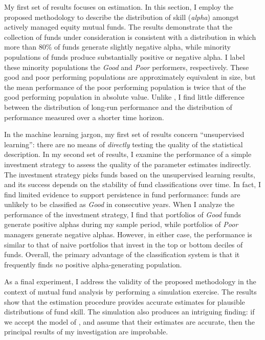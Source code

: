 	My first set of results focuses on estimation. In this section, I employ the proposed methodology to describe the distribution of skill (\textit{alpha}) amongst actively managed equity mutual funds. The results demonstrate that the collection of funds under consideration is consistent with a distribution in which more than 80\% of funds generate slightly negative alpha, while minority populations of funds produce substantially positive or negative alpha. I label these minority populations the \textit{Good} and \textit{Poor} performers, respectively. These good and poor performing populations are approximately equivalent in size, but the mean performance of the poor performing population is twice that of the good performing population in absolute value. Unlike \citet{Barras2010}, I find little difference between the distribution of long-run performance and the distribution of performance measured over a shorter time horizon.

	In the machine learning jargon, my first set of results concern ``unsupervised learning'': there are no means of \textit{directly} testing the quality of the statistical description. In my second set of results, I examine the performance of a simple investment strategy to assess the quality of the parameter estimates indirectly. The investment strategy picks funds based on the unsupervised learning results, and its success depends on the stability of fund classifications over time. In fact, I find limited evidence to support persistence in fund performance: funds are unlikely to be classified as \textit{Good} in consecutive years. When I analyze the performance of the investment strategy, I find that portfolios of \textit{Good} funds generate positive alphas during my sample period, while portfolios of \textit{Poor} managers generate negative alphas. However, in either case, the performance is similar to that of naive portfolios that invest in the top or bottom deciles of funds. Overall, the primary advantage of the classification system is that it frequently finds \textit{no} positive alpha-generating population.

	As a final experiment, I address the validity of the proposed methodology in the context of mutual fund analysis by performing a simulation exercise. The results show that the estimation procedure provides accurate estimates for plausible distributions of fund skill. The simulation also produces an intriguing finding: if we accept the model of \citet{Barras2010}, and assume that their estimates are accurate, then the principal results of my investigation are improbable.

